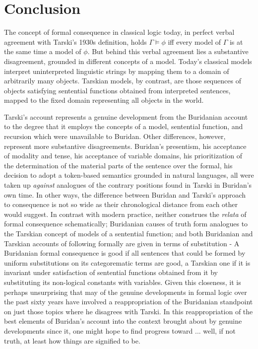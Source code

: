 \documentclass[]{article}
\begin{document}
\section{Conclusion}
The concept of formal consequence in classical logic today, in perfect verbal agreement with Tarski's 1930s definition, holds $\Gamma \models \phi$ iff every model of $\Gamma$ is at the same time a model of $\phi$. But behind this verbal agreement lies a substantive disagreement, grounded in different concepts of a model. Today's classical models interpret uninterpreted linguistic strings by mapping them to a domain of arbitrarily many objects. Tarskian models, by contrast, are those sequences of objects satisfying sentential functions obtained from interpreted sentences, mapped to the fixed domain representing all objects in the world. 

Tarski's account represents a genuine development from the Buridanian account to the degree that it employs the concepts of a model, sentential function, and recursion which were unavailable to Buridan. Other differences, however, represent more substantive disagreements. Buridan's presentism, his acceptance of modality and tense, his acceptance of variable domains, his prioritization of the determination of the material parts of the sentence over the formal, his decision to adopt a token-based semantics grounded in natural languages, all were taken up \textit{against} analogues of the contrary positions found in Tarski in Buridan's own time. In other ways, the difference between Buridan and Tarski's approach to consequence is not so wide as their chronological distance from each other would suggest. In contrast with modern practice, neither construes the \textit{relata} of formal consequence schematically; Buridanian causes of truth form analogues to the Tarskian concept of models of a sentential function; and both Buridanian and Tarskian accounts of following formally are given in terms of substitution - A Buridanian formal consequence is good if all sentences that could be formed by uniform substitutions on its categorematic terms are good, a Tarskian one if it is invariant under satisfaction of sentential functions obtained from it by substituting its non-logical constants with variables. Given this closeness, it is perhaps unsurprising that may of the genuine developments in formal logic over the past sixty years have involved a reappropriation of the Buridanian standpoint on just those topics where he disagrees with Tarski. In this reappropriation of the best elements of Buridan's account into the context brought about by genuine developments since it, one might hope to find progress toward ... well, if not truth, at least how things are signified to be.


\end{document}
